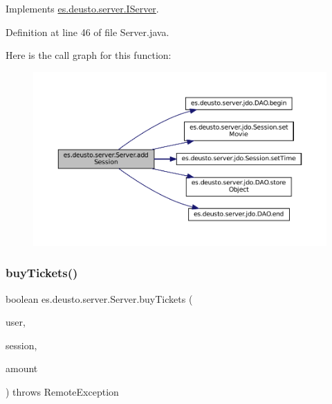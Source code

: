 Implements \mbox{\hyperlink{interfacees_1_1deusto_1_1server_1_1_i_server_a6dea6fa95033d6339b3da87217adad77}{es.\+deusto.\+server.\+I\+Server}}.



Definition at line 46 of file Server.\+java.

Here is the call graph for this function\+:
\nopagebreak
\begin{figure}[H]
\begin{center}
\leavevmode
\includegraphics[width=350pt]{classes_1_1deusto_1_1server_1_1_server_a465a6299e03ec7d69ed238cb96292e9c_cgraph}
\end{center}
\end{figure}
\mbox{\label{classes_1_1deusto_1_1server_1_1_server_a3bbf9f19774d2fae5c831cfac1f2306c}} 
\subsubsection{\texorpdfstring{buyTickets()}{buyTickets()}}
{\footnotesize\ttfamily boolean es.\+deusto.\+server.\+Server.\+buy\+Tickets (\begin{DoxyParamCaption}\item[{\mbox{\hyperlink{classes_1_1deusto_1_1server_1_1data_1_1_user_d_t_o}{User\+D\+TO}}}]{user,  }\item[{\mbox{\hyperlink{classes_1_1deusto_1_1server_1_1data_1_1_session_d_t_o}{Session\+D\+TO}}}]{session,  }\item[{int}]{amount }\end{DoxyParamCaption}) throws Remote\+Exception}



